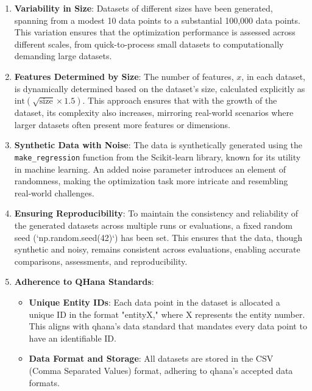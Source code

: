 \documentclass[
  a4paper,  %
  twoside,  %
  bibliography=totoc,
  headsepline,
  cleardoublepage=empty,
  parskip=half,
  draft=false
]{scrbook}
\begin{document}
\begin{enumerate}
    \item \textbf{Variability in Size}: Datasets of different sizes have been generated, spanning from a modest 10 data points to a substantial 100,000 data points.
    This variation ensures that the optimization performance is assessed across different scales, from quick-to-process small datasets to computationally demanding large datasets.

    \item \textbf{Features Determined by Size}: The number of features, \( x \), in each dataset, is dynamically determined based on the dataset's size, calculated explicitly as \( \text{int}(\sqrt{\text{size}} \times 1.5) \).
    This approach ensures that with the growth of the dataset, its complexity also increases, mirroring real-world scenarios where larger datasets often present more features or dimensions.

    \item \textbf{Synthetic Data with Noise}: The data is synthetically generated using the \texttt{make\_regression} function from the Scikit-learn library, known for its utility in machine learning.
    An added noise parameter introduces an element of randomness, making the optimization task more intricate and resembling real-world challenges.

    \item \textbf{Ensuring Reproducibility}: To maintain the consistency and reliability of the generated datasets across multiple runs or evaluations, a fixed random seed (`np.random.seed(42)`) has been set.
    This ensures that the data, though synthetic and noisy, remains consistent across evaluations, enabling accurate comparisons, assessments, and reproducibility.

    \item \textbf{Adherence to QHana Standards}:
   \begin{itemize}
        \item \textbf{Unique Entity IDs}: Each data point in the dataset is allocated a unique ID in the format "entityX," where X represents the entity number.
This aligns with \gls{qhana}'s data standard that mandates every data point to have an identifiable ID.
        \item \textbf{Data Format and Storage}: All datasets are stored in the CSV (Comma Separated Values) format, adhering to \gls{qhana}'s accepted data formats.
    \end{itemize}
\end{enumerate}
\end{document}
